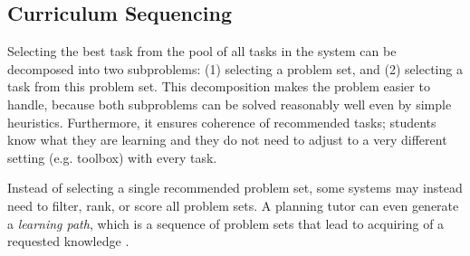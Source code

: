 

\subsection{Curriculum Sequencing}



Selecting the best task from the pool of all tasks in the system
can be decomposed into two subproblems: (1) selecting a problem set,
and (2) selecting a task from this problem set.
This decomposition makes the problem easier to handle, because
both subproblems can be solved reasonably well even by simple heuristics.
Furthermore, it ensures coherence of recommended tasks;
students know what they are learning and they do not need to adjust to a very
different setting (e.g. toolbox) with every task.

Instead of selecting a single recommended problem set, some systems may
instead need to filter, rank, or score all problem sets.
A planning tutor can even generate a \emph{learning path}, which is a sequence
of problem sets that lead to acquiring of a requested knowledge
\cite{its-programming}.

